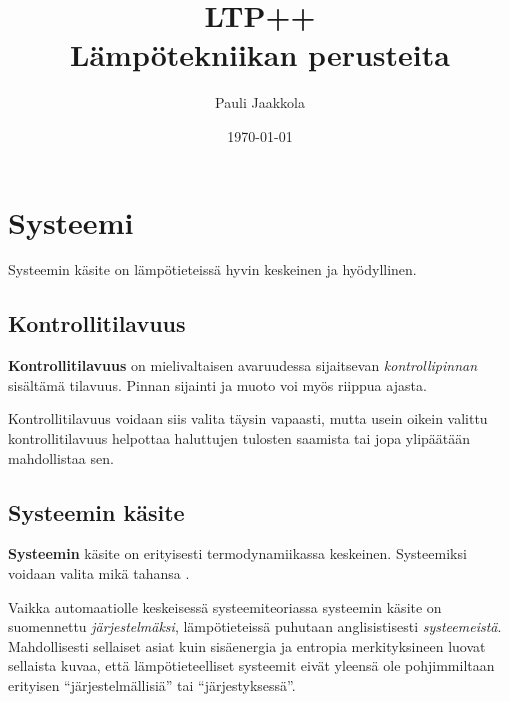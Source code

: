 \documentclass[12pt,a4paper,finnish]{book}
\title{LTP++\\Lämpötekniikan perusteita}
\date{\today}
\author{Pauli Jaakkola}
\begin{document}
\maketitle
\newpage
{}
\tableofcontents
\newpage
{}

% 

\chapter{Systeemi} %

Systeemin käsite on lämpötieteissä hyvin keskeinen ja hyödyllinen.

\section{Kontrollitilavuus} \label{section:kontrollitilavuus}

\textbf{Kontrollitilavuus} on mielivaltaisen avaruudessa sijaitsevan \textit{kontrollipinnan} sisältämä tilavuus. 
Pinnan sijainti ja muoto voi myös riippua ajasta. 

Kontrollitilavuus voidaan siis valita täysin vapaasti, 
mutta usein oikein valittu kontrollitilavuus helpottaa haluttujen tulosten saamista tai jopa ylipäätään mahdollistaa sen.

\section{Systeemin käsite}

\textbf{Systeemin} käsite on erityisesti termodynamiikassa keskeinen. Systeemiksi voidaan valita mikä tahansa 
.

Vaikka automaatiolle keskeisessä systeemiteoriassa systeemin käsite on suomennettu \textit{järjestelmäksi},
lämpötieteissä puhutaan anglisistisesti \textit{systeemeistä}. Mahdollisesti sellaiset asiat kuin 
sisäenergia ja entropia merkityksineen luovat sellaista kuvaa, että lämpötieteelliset systeemit eivät 
yleensä ole pohjimmiltaan erityisen ``järjestelmällisiä'' tai ``järjestyksessä''.
\end{document}
